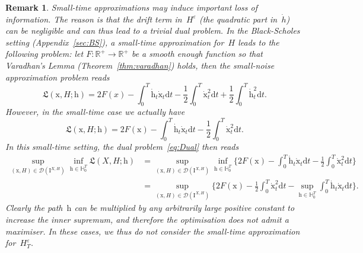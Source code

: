 \documentclass{amsart}[11pt]
\numberwithin{equation}{section}
\numberwithin{theorem}{subsection}
\numberwithin{proposition}{subsection}
\numberwithin{definition}{subsection}
\numberwithin{lemma}{subsection}
\newtheorem*{remark}{Remark}
\numberwithin{assumption}{subsection}
\newcommand{\Dd}{\mathcal{D}}
\newcommand{\HH}{\mathbb{H}}
\newcommand{\RR}{\mathbb{R}}
\newcommand{\Lf}{\mathfrak{L}}
\newcommand{\D}{\mathrm{d}}
\newcommand{\E}{\mathrm{e}}
\newcommand{\II}{\mathrm{I}}
\newcommand{\eps}{\varepsilon}
\newcommand{\hm}{\mathrm{h}}
\newcommand{\xm}{\mathrm{x}}
\newcommand{\half}{\frac{1}{2}}
\begin{document}
\begin{remark}
Small-time approximations may induce important loss of information. 
The reason is that the drift term in~$H^\eps$ (the quadratic part in~$\dot{h}$) can be negligible and can thus lead to a trivial dual problem. 
In the Black-Scholes setting (Appendix~\ref{sec:BS}),
a small-time approximation for~$H$ leads to the following problem: 
let $F:\RR^+\rightarrow\RR^+$ be a smooth enough function so that Varadhan's Lemma (Theorem~\ref{thm:varadhan}) holds, then the small-noise approximation problem reads
$$
\Lf(\xm,H;\hm) = 2 F(x)  - \int_0^T\dot{\hm}_t \dot{\xm}_t\D t
- \half\int_0^T\dot{\xm}_t^2\D t
+ \half\int_0^T\dot{\hm}_t^2\D t.
$$
However, in the small-time case we actually have
$$
\Lf(\xm,H;\hm) = 
2F(\xm) - \int_0^T\dot{\hm}_t \dot{\xm}_t\D t
- \half\int_0^T\dot{\xm}_t^2\D t.
$$
In this small-time setting, the dual problem~\eqref{eq:Dual} then reads
\begin{align*}
\sup_{(\xm,H)\in\Dd(\II^{X,H})}\inf_{\hm\in\HH^T_0} \Lf(X,H;\hm)
 & = \sup_{(\xm,H)\in \Dd(\II^{X,H})} \inf_{\hm\in\HH^T_0} \Big\{2F(\xm) - \int_0^T\dot{\hm}_t \dot{\xm}_t\D t - \half\int_0^T\dot{\xm}_t^2\D t\Big\}\\
 & = \sup_{(\xm,H)\in \Dd(\II^{X,H})} \Big\{2F(\xm)
 - \half\int_0^T\dot{\xm}_t^2\D t
 - \sup_{\hm\in\HH^T_0}\int_0^T\dot{\hm}_t \dot{\xm}_t\D t\Big\}.
\end{align*}
Clearly the path~$\hm$ can be multiplied by any arbitrarily large positive constant to increase the inner supremum, 
and therefore the optimisation does not admit a maximiser.
In these cases, we thus do not consider the small-time approximation for~$H^{\eps}_T$.
\end{remark}

\end{document}
